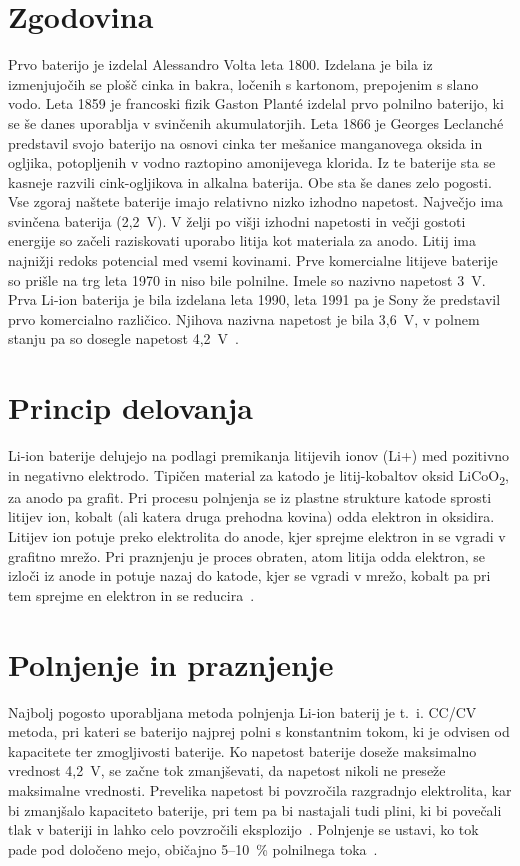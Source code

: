 \documentclass[a4paper,twoside,openright,12pt,slovene]{book}
\begin{document}
\section{Zgodovina}\label{sec:zgodovina}
Prvo baterijo je izdelal Alessandro Volta leta 1800.
Izdelana je bila iz izmenjujočih se plošč cinka in bakra, ločenih s kartonom, prepojenim s slano vodo.
Leta 1859 je francoski fizik Gaston Planté izdelal prvo polnilno baterijo, ki se še danes uporablja v svinčenih akumulatorjih.
Leta 1866 je Georges Leclanché predstavil svojo baterijo na osnovi cinka ter mešanice manganovega oksida in ogljika, potopljenih v vodno raztopino amonijevega klorida.
Iz te baterije sta se kasneje razvili cink-ogljikova in alkalna baterija.
Obe sta še danes zelo pogosti.
Vse zgoraj naštete baterije imajo relativno nizko izhodno napetost.
Največjo ima svinčena baterija (2,2~V).
V želji po višji izhodni napetosti in večji gostoti energije so začeli raziskovati uporabo litija kot materiala za anodo.
Litij ima najnižji redoks potencial med vsemi kovinami.
Prve komercialne litijeve baterije so prišle na trg leta 1970 in niso bile polnilne.
Imele so nazivno napetost 3~V. Prva Li-ion baterija je bila izdelana leta 1990, leta 1991 pa je Sony že predstavil prvo komercialno različico.
Njihova nazivna napetost je bila 3,6~V, v polnem stanju pa so dosegle napetost 4,2~V~\cite{wu_lithium-ion_2015}.
\newpage

\section{Princip delovanja}\label{sec:princip-delovanja}
Li-ion baterije delujejo na podlagi premikanja litijevih ionov (Li+) med pozitivno in negativno elektrodo.
Tipičen material za katodo je litij-kobaltov oksid LiCoO\textsubscript{2}, za anodo pa grafit.
Pri procesu polnjenja se iz plastne strukture katode sprosti litijev ion, kobalt (ali katera druga prehodna kovina) odda elektron in oksidira.
Litijev ion potuje preko elektrolita do anode, kjer sprejme elektron in se vgradi v grafitno mrežo.
Pri praznjenju je proces obraten, atom litija odda elektron, se izloči iz anode in potuje nazaj do katode, kjer se vgradi v mrežo, kobalt pa pri tem sprejme en elektron in se reducira~\cite{wu_lithium-ion_2015}.

\section{Polnjenje in praznjenje}\label{sec:polnjenje-in-praznjenje}
Najbolj pogosto uporabljana metoda polnjenja Li-ion baterij je t.~i.
CC/CV metoda, pri kateri se baterijo najprej polni s konstantnim tokom, ki je odvisen od kapacitete ter zmogljivosti baterije.
Ko napetost baterije doseže maksimalno vrednost 4,2~V, se začne tok zmanjševati, da napetost nikoli ne preseže maksimalne vrednosti.
Prevelika napetost bi povzročila razgradnjo elektrolita, kar bi zmanjšalo kapaciteto baterije,
pri tem pa bi nastajali tudi plini, ki bi povečali tlak v bateriji in lahko celo povzročili eksplozijo~\cite{wu_lithium-ion_2015}.
Polnjenje se ustavi, ko tok pade pod določeno mejo, običajno 5--10~\% polnilnega toka~\cite{dung_robust_2016}.
\end{document}
